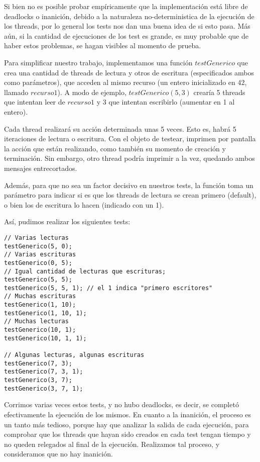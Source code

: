 Si bien no es posible probar empíricamente que la implementación está libre de deadlocks o inanición, debido a la naturaleza no-deterministica de la ejecución de los threads, por lo general los tests nos dan una buena idea de si esto pasa. Más aún, si la cantidad de ejecuciones de los test es grande, es muy probable que de haber estos problemas, se hagan visibles al momento de prueba. 

Para simplificar nuestro trabajo, implementamos una función $testGenerico$ que crea una cantidad de threads de lectura y otros de escritura (especificados ambos como parámetros), que acceden al mismo recurso (un entero inicializado en 42, llamado $recurso1$). A modo de ejemplo, $testGenerico(5, 3)$ crearía 5 threads que intentan leer de $recurso1$ y 3 que intentan escribirlo (aumentar en 1 al entero). 

Cada thread realizará su acción determinada unas 5 veces. Esto es, habrá 5 iteraciones de lectura o escritura. Con el objeto de testear, imprimen por pantalla la acción que están realizando, como también su momento de creación y terminación. Sin embargo, otro thread podría imprimir a la vez, quedando ambos mensajes entrecortados.

Además, para que no sea un factor decisivo en nuestros tests, la función toma un parámetro para indicar si es que los threads de lectura se crean primero (default), o bien los de escritura lo hacen (indicado con un 1). 

Así, pudimos realizar los siguientes tests: 

\begin{lstlisting}
// Varias lecturas
testGenerico(5, 0);
// Varias escrituras
testGenerico(0, 5);
// Igual cantidad de lecturas que escrituras;
testGenerico(5, 5);
testGenerico(5, 5, 1); // el 1 indica "primero escritores"
// Muchas escrituras
testGenerico(1, 10);
testGenerico(1, 10, 1);
// Muchas lecturas
testGenerico(10, 1);
testGenerico(10, 1, 1);

// Algunas lecturas, algunas escrituras
testGenerico(7, 3);
testGenerico(7, 3, 1);
testGenerico(3, 7);
testGenerico(3, 7, 1);
\end{lstlisting}

Corrimos varias veces estos tests, y no hubo deadlocks, es decir, se completó efectivamente la ejecución de los mismos. En cuanto a la inanición, el proceso es un tanto más tedioso, porque hay que analizar la salida de cada ejecución, para comprobar que los threads que hayan sido creados en cada test tengan tiempo y no queden relegados al final de la ejecución. Realizamos tal proceso, y consideramos que no hay inanición.